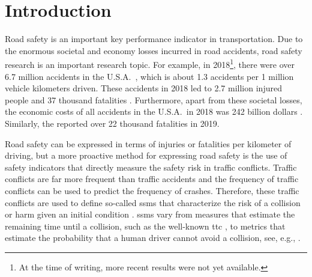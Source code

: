 \section{Introduction}
\label{sec:introduction}

Road safety is an important key performance indicator in transportation. 
Due to the enormous societal and economy losses incurred in road accidents, road safety research is an important research topic.
For example, in 2018\cstarta\footnote{\cstarta At the time of writing, more recent results were not yet available.\cenda}\cenda, there were over 6.7 million accidents in the U.S.A.\ \autocite{nhtsa2020summary}, which is about 1.3 accidents per 1 million vehicle kilometers driven.
These accidents in 2018 led to 2.7 million injured people and 37 thousand fatalities \autocite{nhtsa2020summary}.
Furthermore, apart from these societal losses, the economic costs of all accidents in the U.S.A.\ in 2018 was 242 billion dollars \autocite{nhtsa2020summary}.
Similarly, the \textcite{eu2020roadsafety} reported over 22 thousand fatalities in 2019.

Road safety can be expressed in terms of injuries or fatalities per kilometer of driving, but a more proactive method for expressing road safety is the use of safety indicators that directly measure the safety risk in traffic conflicts.
Traffic conflicts are far more frequent than traffic accidents and the frequency of traffic conflicts can be used to predict the frequency of crashes.
\cstarta Therefore, these traffic conflicts are used to define so-called \acp{ssm} that characterize the risk of a collision or harm given an initial condition \autocite{arun2021systematic}. \cenda
\acp{ssm} vary from measures that estimate the remaining time until a collision, such as the well-known \ac{ttc} \autocite{hayward1972near}, to metrics that estimate the probability that a human driver cannot avoid a collision, see, e.g., \autocite{wang2014evaluation}.

